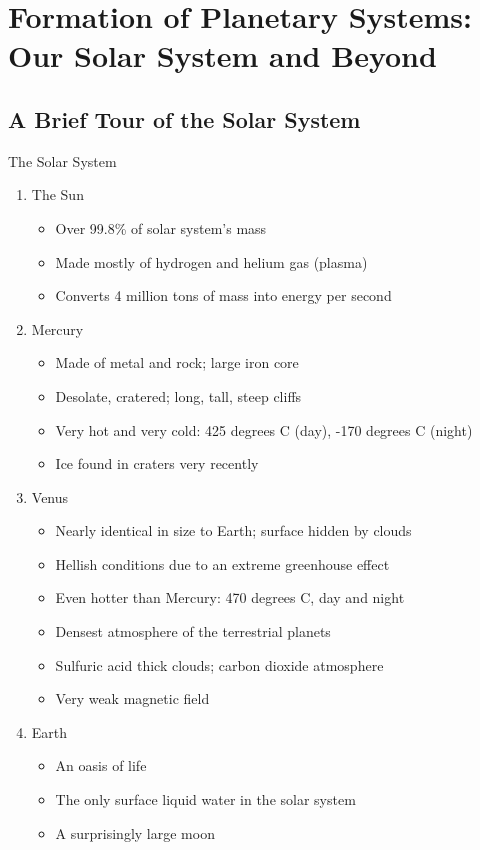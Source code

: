 \documentclass[12pt]{article}
\begin{document}
\section{Formation of Planetary Systems: Our Solar System and Beyond} 
\subsection{A Brief Tour of the Solar System} 
The Solar System \begin{enumerate} 
\item The Sun \begin{itemize} 
\item Over 99.8\% of solar system's mass 
\item Made mostly of hydrogen and helium gas (plasma)
\item Converts 4 million tons of mass into energy per second \end{itemize}
\item Mercury \begin{itemize} 
\item Made of metal and rock; large iron core 
\item Desolate, cratered; long, tall, steep cliffs 
\item Very hot and very cold: 425 degrees C (day), -170 degrees C (night)
\item Ice found in craters very recently \end{itemize} 
\item Venus \begin{itemize} 
\item Nearly identical in size to Earth; surface hidden by clouds 
\item Hellish conditions due to an extreme greenhouse effect 
\item Even hotter than Mercury: 470 degrees C, day and night
\item Densest atmosphere of the terrestrial planets 
\item Sulfuric acid thick clouds; carbon dioxide atmosphere
\item Very weak magnetic field \end{itemize} 
\item Earth \begin{itemize} 
\item An oasis of life 
\item The only surface liquid water in the solar system 
\item A surprisingly large moon \end{itemize} 

\end{enumerate}
\end{document}

